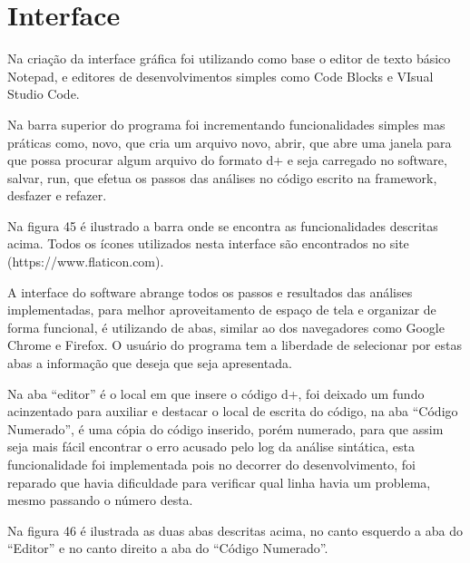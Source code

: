 \documentclass[12pt,oneside,a4paper,chapter=TITLE,section=TITLE,sumario=tradicional]{abntex2}
\begin{document}
\section{Interface}
\label{sec:interface}

Na criação da interface gráfica foi utilizando como base o editor de texto básico Notepad, e editores de desenvolvimentos simples como Code Blocks e VIsual Studio Code. 

Na barra superior do programa foi incrementando funcionalidades simples mas práticas como, novo, que cria um arquivo novo, abrir, que abre uma janela para que possa procurar algum arquivo do formato d+ e seja carregado no software, salvar, run, que efetua os passos das análises no código escrito na framework, desfazer e refazer. 

Na figura 45 é ilustrado a barra onde se encontra as funcionalidades descritas acima. Todos os ícones utilizados nesta interface são encontrados no site (https://www.flaticon.com).

\begin{figure}[htb]
\end{figure} 

A interface do software abrange todos os passos e resultados das análises implementadas, para melhor aproveitamento de espaço de tela e organizar de forma funcional, é utilizando de abas, similar ao dos navegadores como Google Chrome e Firefox. O usuário do programa tem a liberdade de selecionar por estas abas a informação que deseja que seja apresentada. 

Na aba “editor” é o local em que insere o código d+, foi deixado um fundo acinzentado para auxiliar e destacar o local de escrita do código, na aba “Código Numerado”, é uma cópia do código inserido, porém numerado, para que assim seja mais fácil encontrar o erro acusado pelo log da análise sintática, esta funcionalidade foi implementada pois no decorrer do desenvolvimento, foi reparado que havia dificuldade para verificar qual linha havia um problema, mesmo passando o número desta. 

Na figura 46 é ilustrada as duas abas descritas acima, no canto esquerdo a aba do “Editor” e no canto direito a aba do “Código Numerado”. 

\begin{figure}[htb]
\end{figure}
\end{document}
